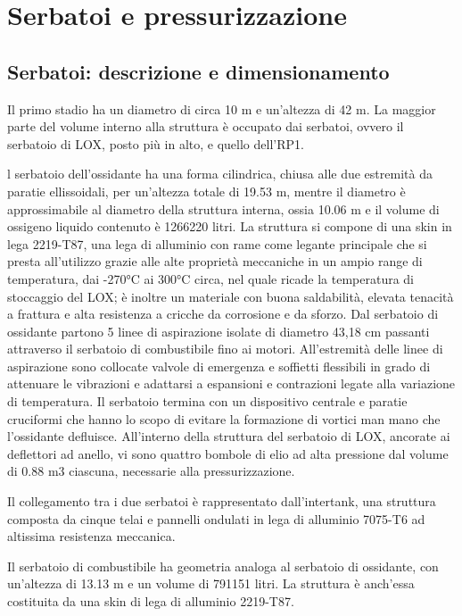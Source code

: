 \section{Serbatoi e pressurizzazione}
\label{sec:serbatoi e pressurizzazione}

\subsection{Serbatoi: descrizione e dimensionamento}
\label{subsec:Serbatoi:descrizione_e_dimensionamento}

Il primo stadio ha un diametro di circa 10 m e un’altezza di 42 m. La maggior parte del volume interno alla struttura è occupato dai serbatoi, ovvero il serbatoio di LOX, posto più in alto, e quello dell’RP1. 

l serbatoio dell’ossidante ha una forma cilindrica, chiusa alle due estremità da paratie ellissoidali, per un’altezza totale di 19.53 m, mentre il diametro è approssimabile al diametro della struttura interna, ossia 10.06 m e il volume di ossigeno liquido contenuto è 1266220 litri. 
La struttura si compone di una skin in lega 2219-T87, una lega di alluminio con rame come legante principale che si presta all’utilizzo grazie alle alte proprietà meccaniche in un ampio range di temperatura, dai -270°C ai 300°C circa, nel quale ricade la temperatura di stoccaggio del LOX; è inoltre un materiale con buona saldabilità, elevata tenacità a frattura e alta resistenza a cricche da corrosione e da sforzo. 
Dal serbatoio di ossidante partono 5 linee di aspirazione isolate di diametro 43,18 cm passanti attraverso il serbatoio di combustibile fino ai motori. All’estremità delle linee di aspirazione sono collocate valvole di emergenza e soffietti flessibili in grado di attenuare le vibrazioni e adattarsi a espansioni e contrazioni legate alla variazione di temperatura. 
Il serbatoio termina con un dispositivo centrale e paratie cruciformi che hanno lo scopo di evitare la formazione di vortici man mano che l’ossidante defluisce.
All’interno della struttura del serbatoio di LOX, ancorate ai deflettori ad anello, vi sono quattro bombole di elio ad alta pressione dal volume di 0.88 m3 ciascuna, necessarie alla pressurizzazione.

Il collegamento tra i due serbatoi è rappresentato dall’intertank, una struttura composta da cinque telai e pannelli ondulati in lega di alluminio 7075-T6 ad altissima resistenza meccanica.

Il serbatoio di combustibile ha geometria analoga al serbatoio di ossidante, con un’altezza di 13.13 m e un volume di 791151 litri. La struttura è anch’essa costituita da una skin di lega di alluminio 2219-T87.

